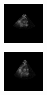 \begin{figure}[htb]
\begin{subfigure}[b]{0.245\textwidth}
                \includegraphics[width=\linewidth]{img_seg/32_post}
        \end{subfigure}%
        \begin{subfigure}[b]{0.245\textwidth}
                \centering
                \includegraphics[width=\linewidth]{img_seg/33_post}

\end{subfigure}
\end{figure}
